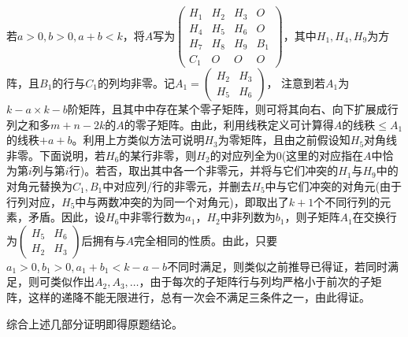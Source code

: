 \documentclass[a4paper,UTF8,fontset=windows]{ctexart}
\begin{document}
\begin{enumerate}
若$a>0,b>0,a+b<k$，将$A$写为$\begin{pmatrix}H_1&H_2&H_3&O\\H_4&H_5&H_6&O\\H_7&H_8&H_9&B_1\\C_1&O&O&O\end{pmatrix}$，其中$H_1,H_4,H_9$为方阵，且$B_1$的行与$C_1$的列均非零。记$A_1=\begin{pmatrix}H_2&H_3\\H_5&H_6\end{pmatrix}$， 注意到若$A_1$为$k-a\times k-b$阶矩阵，且其中中存在某个零子矩阵，则可将其向右、向下扩展成行列之和多$m+n-2k$的$A$的零子矩阵。由此，利用线秩定义可计算得$A$的线秩$\le A_1$的线秩$+a+b$。利用上方类似方法可说明$H_3$为零矩阵，且由之前假设知$H_5$对角线非零。下面说明，若$H_6$的某行非零，则$H_2$的对应列全为0(这里的对应指在$A$中恰为第$i$列与第$i$行)。若否，取出其中各一个非零元，并将与它们冲突的$H_1$与$H_9$中的对角元替换为$C_1,B_1$中对应列/行的非零元，并删去$H_5$中与它们冲突的对角元(由于行列对应，$H_5$中与两数冲突的为同一个对角元)，即取出了$k+1$个不同行列的元素，矛盾。因此，设$H_6$中非零行数为$a_1$，$H_2$中非列数为$b_1$，则子矩阵$A_1$在交换行为$\begin{pmatrix}H_5&H_6\\H_2&H_3\end{pmatrix}$后拥有与$A$完全相同的性质。由此，只要$a_1>0,b_1>0,a_1+b_1<k-a-b$不同时满足，则类似之前推导已得证，若同时满足，则可类似作出$A_2,A_3,\dots$，由于每次的子矩阵行与列均严格小于前次的子矩阵，这样的递降不能无限进行，总有一次会不满足三条件之一，由此得证。

综合上述几部分证明即得原题结论。
\end{enumerate}
\end{document}
